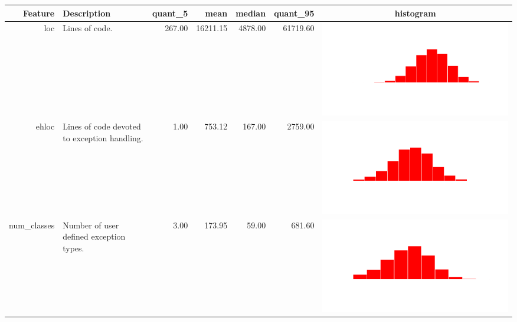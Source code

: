 \begin{table}[ht]
\centering
\begin{tabular}{rp{16em}rrrrc}
  \hline
Feature & Description & quant\_5 & mean & median & quant\_95 & histogram \\ 
  \hline
loc & Lines of code. & 267.00 & 16211.15 & 4878.00 & 61719.60 & \includegraphics[scale = 0.1, clip = true, trim= 50px 60px 50px 60px]{hist-4fea7249a109b9e1d6791b4c1ebc1f38.pdf} \\ 
  ehloc & Lines of code devoted to exception handling. & 1.00 & 753.12 & 167.00 & 2759.00 & \includegraphics[scale = 0.1, clip = true, trim= 50px 60px 50px 60px]{hist-40db73293da278b6983709bc45b14f55.pdf} \\ 
  num\_classes & Number of user defined exception types. & 3.00 & 173.95 & 59.00 & 681.60 & \includegraphics[scale = 0.1, clip = true, trim= 50px 60px 50px 60px]{hist-027fd281b3f6bc7386445836eee5d87e.pdf} \\ 

\end{tabular}
\end{table}
